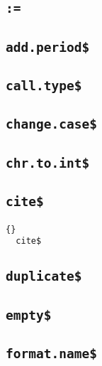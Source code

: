 \INCOMPLETE

\subsection{\texttt{:=}}

\INCOMPLETE

\subsection{\texttt{add.period\$}}

\INCOMPLETE

\subsection{\texttt{call.type\$}}

\INCOMPLETE

\subsection{\texttt{change.case\$}}

\INCOMPLETE

\subsection{\texttt{chr.to.int\$}}

\INCOMPLETE

\subsection{\texttt{cite\$}}

\begin{lstlisting}{}
  cite$
\end{lstlisting}

\INCOMPLETE

\subsection{\texttt{duplicate\$}}

\INCOMPLETE

\subsection{\texttt{empty\$}}

\INCOMPLETE

\subsection{\texttt{format.name\$}}

